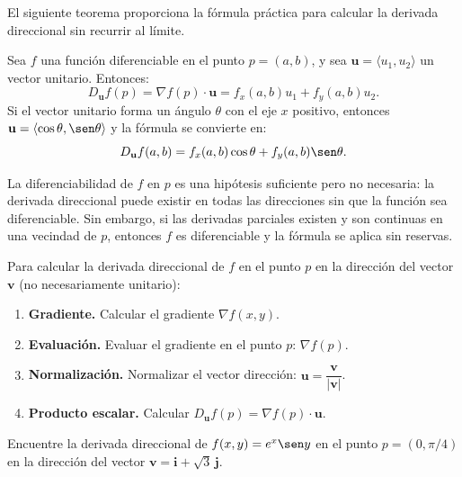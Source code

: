 El siguiente teorema proporciona la fórmula práctica para calcular la
derivada direccional sin recurrir al límite.

\begin{theorem}
Sea $f$ una función diferenciable en el punto $p=(a,b)$, y sea
$\mathbf{u}=\langle u_1,u_2\rangle$ un vector unitario. Entonces:
\[
D_{\mathbf{u}} f(p) = \nabla f(p) \cdot \mathbf{u}
= f_x(a,b) u_1 + f_y(a,b) u_2.
\]
Si el vector unitario forma un ángulo $\theta$ con el eje $x$ positivo,
entonces $\mathbf{u} = \langle \cos\theta, \sen\theta \rangle$ y la
fórmula se convierte en:
\[
D_{\mathbf{u}} f(a,b) = f_x(a,b)\cos\theta + f_y(a,b)\sen\theta.
\]
\end{theorem}

\begin{rem}
La diferenciabilidad de $f$ en $p$ es una hipótesis suficiente pero no
necesaria: la derivada direccional puede existir en todas las direcciones
sin que la función sea diferenciable. Sin embargo, si las derivadas
parciales existen y son continuas en una vecindad de $p$, entonces $f$ es
diferenciable y la fórmula se aplica sin reservas.
\end{rem}

\begin{pasos}
Para calcular la derivada direccional de $f$ en el punto $p$ en la
dirección del vector $\mathbf{v}$ (no necesariamente unitario):
\begin{enumerate}
    \item \textbf{Gradiente.} Calcular el gradiente $\nabla f(x,y)$.
    \item \textbf{Evaluación.} Evaluar el gradiente en el punto $p$:
    $\nabla f(p)$.
    \item \textbf{Normalización.} Normalizar el vector dirección:
    $\mathbf{u} = \dfrac{\mathbf{v}}{|\mathbf{v}|}$.
    \item \textbf{Producto escalar.} Calcular
    $D_{\mathbf{u}} f(p) = \nabla f(p)\cdot \mathbf{u}$.
\end{enumerate}
\end{pasos}

\begin{example}
Encuentre la derivada direccional de $f(x,y) = e^x \sen y$ en el punto
$p = (0, \pi/4)$ en la dirección del vector $\mathbf{v} = \mathbf{i} +
\sqrt{3}\,\mathbf{j}$.
\end{example}

